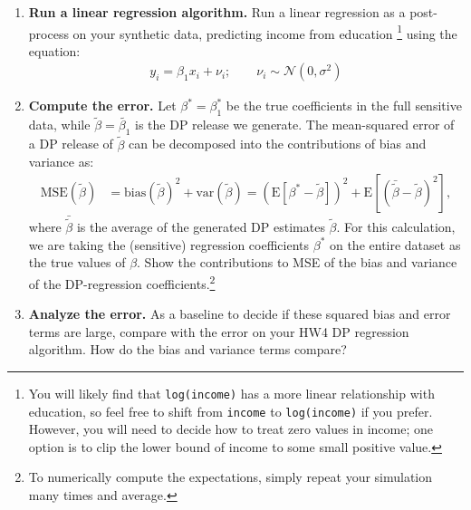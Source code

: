 \documentclass[11pt]{article}
\begin{document}
\begin{enumerate}[leftmargin=*]
\begin{enumerate}
            $x_i$ variables are generated uniformly  random from $[-5,5]$ and the
            $y_i$'s
            are generated according to a linear model with slope 1, intercept 0, and Gaussian noise, but clipped to $[-10,10]$:
            $$y_i = \left[x_i + \mathcal{N}(0,.2)\right]_{-10}^{10}.$$
            We will treat this data as sensitive. Then,
            create a DP
            histogram\footnote{That is, a histogram representation counting the occurrences of having all possible combinations of the
            two binned variables.} release of income and education.
            You do not need to graph this histogram, just compute the release for each binned combination of the variables.  From this, you should be able to generate synthetic data of these two
            variables. (For continuous data, you will need to do binning to apply a histogram.)
            \item \textbf{Run a linear regression algorithm.} Run a linear regression as a post-process on your synthetic data, predicting income from education
            \footnote{You will likely find that \texttt{log(income)} has a more linear relationship with education,
                so feel free to shift from \texttt{income} to \texttt{log(income)} if you prefer. However, you will need to decide how to treat zero values in income; one option is to clip the lower bound of income to some small positive value.} using the equation:
            \begin{align}
                y_i =  \beta_1 x_i
                + \nu_i; \qquad \nu_i \sim \mathcal{N}(0, \sigma^2) \label{eq:ydist}
            \end{align}
            \item \textbf{Compute the error.}
            Let $\beta^*=\beta_1^*$
            be the true coefficients in the full sensitive data, while  $\tilde{\beta}=\tilde{\beta_1}$ is the DP release we generate. The mean-squared error of a DP release of $\tilde{\beta}$ can be decomposed into the contributions of bias and variance as:
            \begin{align}
                \textrm{MSE}(\tilde{\beta}) &= \textrm{bias}(\tilde{\beta})^2 + \textrm{var}(\tilde{\beta})  =  (\textrm{E}[ \beta^* - \tilde{\beta}])^2 +    \textrm{E}[(\bar{\tilde{\beta}} - \tilde{\beta})^2] ,
            \end{align}
            where $\bar{\tilde{\beta}}$ is the average of the generated
            DP estimates $\tilde\beta$.
            For this calculation, we are taking the (sensitive) regression coefficients $\beta^*$ on the entire dataset as the true values of $\beta$. Show the contributions to MSE of the bias and variance of the DP-regression coefficients.\footnote{To numerically compute the expectations, simply repeat your simulation many times and average.}
            \item \textbf{Analyze the error.} As a baseline to decide if these squared bias and error terms are large, compare with the error on your HW4 DP regression algorithm. How do the bias and variance terms compare?
        \end{enumerate}



\end{enumerate}
\end{document}
